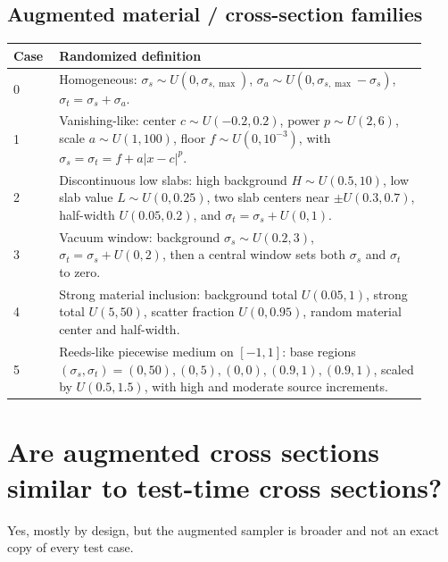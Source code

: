 \documentclass[10pt]{article}
\begin{document}
\subsection*{Augmented material / cross-section families}
\begin{longtable}{p{0.10\linewidth} p{0.82\linewidth}}
\toprule
Case & Randomized definition \\
\midrule
0 & Homogeneous: \(\sigma_s\sim U(0,\sigma_{s,\max})\), \(\sigma_a\sim U(0,\sigma_{s,\max}-\sigma_s)\), \(\sigma_t=\sigma_s+\sigma_a\). \\
1 & Vanishing-like: center \(c\sim U(-0.2,0.2)\), power \(p\sim U(2,6)\), scale \(a\sim U(1,100)\), floor \(f\sim U(0,10^{-3})\), with \(\sigma_s=\sigma_t=f+a|x-c|^p\). \\
2 & Discontinuous low slabs: high background \(H\sim U(0.5,10)\), low slab value \(L\sim U(0,0.25)\), two slab centers near \(\pm U(0.3,0.7)\), half-width \(U(0.05,0.2)\), and \(\sigma_t=\sigma_s+U(0,1)\). \\
3 & Vacuum window: background \(\sigma_s\sim U(0.2,3)\), \(\sigma_t=\sigma_s+U(0,2)\), then a central window sets both \(\sigma_s\) and \(\sigma_t\) to zero. \\
4 & Strong material inclusion: background total \(U(0.05,1)\), strong total \(U(5,50)\), scatter fraction \(U(0,0.95)\), random material center and half-width. \\
5 & Reeds-like piecewise medium on \([-1,1]\): base regions \((\sigma_s,\sigma_t)=(0,50),(0,5),(0,0),(0.9,1),(0.9,1)\), scaled by \(U(0.5,1.5)\), with high and moderate source increments. \\
\bottomrule
\end{longtable}

\section*{Are augmented cross sections similar to test-time cross sections?}
Yes, mostly by design, but the augmented sampler is broader and not an exact copy of every test case.
\end{document}
